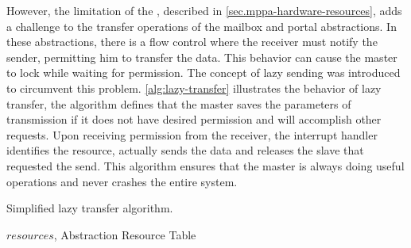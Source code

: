 			However, the limitation of the \dma, described in
			\autoref{sec.mppa-hardware-resources}, adds a challenge to the
			transfer operations of the mailbox and portal abstractions.
			In these abstractions, there is a flow control where the receiver
			must notify the sender, permitting him to transfer the data. This
			behavior can cause the master to lock while waiting for permission.
			The concept of lazy sending was introduced to circumvent this
			problem. \autoref{alg:lazy-transfer} illustrates the behavior of
			lazy transfer, the algorithm defines that the master saves the
			parameters of transmission if it does not have desired permission
			and will accomplish other requests. Upon receiving permission
			from the receiver, the interrupt handler identifies the resource,
			actually sends the data and releases the slave that requested the
			send. This algorithm ensures that the master is always doing useful
			operations and never crashes the entire system.

			\begin{algorithm}[!tb]
				\caption{Simplified lazy transfer algorithm.}%
				\label{alg:lazy-transfer}%
				\begin{algorithmic}[1]
				\Require $resources$, Abstraction Resource Table


						\Else
						\EndIf
					\EndProcedure%


						\Else
						\EndIf
					\EndProcedure%


						                                
					\EndProcedure%

				\end{algorithmic}%

			\end{algorithm}

